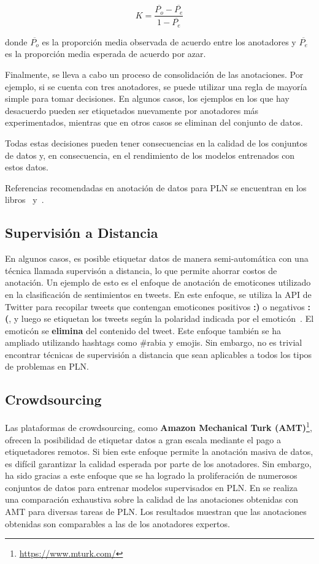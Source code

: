 \[
K = \frac{\overline{P_o} - \overline{P_e}}{1 - \overline{P_e}}
\]

donde \(\overline{P_o}\) es la proporción media observada de acuerdo entre los anotadores y \(\overline{P_e}\) es la proporción media esperada de acuerdo por azar.

Finalmente, se lleva a cabo un proceso de consolidación de las anotaciones. Por ejemplo, si se cuenta con tres anotadores, se puede utilizar una regla de mayoría simple para tomar decisiones. En algunos casos, los ejemplos en los que hay desacuerdo pueden ser etiquetados nuevamente por anotadores más experimentados, mientras que en otros casos se eliminan del conjunto de datos.

Todas estas decisiones pueden tener consecuencias en la calidad de los conjuntos de datos y, en consecuencia, en el rendimiento de los modelos entrenados con estos datos.

Referencias recomendadas en anotación de datos para PLN se encuentran en los libros~\cite{fort2016collaborative} y~\cite{pustejovsky2012natural}.


\subsection{Supervisión a Distancia}

En algunos casos, es posible etiquetar datos de manera semi-automática con una técnica llamada supervisón a distancia, lo que permite ahorrar costos de anotación. Un ejemplo de esto es el enfoque de anotación de emoticones utilizado en la clasificación de sentimientos en tweets. En este enfoque, se utiliza la API de Twitter para recopilar tweets que contengan emoticones positivos \textcolor[rgb]{0.00,0.00,1.00}{\textbf{:)}} o negativos \textcolor[rgb]{1.00,0.00,0.00}{\textbf{:(}}, y luego se etiquetan los tweets según la polaridad indicada por el emoticón~\cite{Read2005}. El emoticón se \textbf{elimina} del contenido del tweet. Este enfoque también se ha ampliado utilizando hashtags como \#rabia y emojis. Sin embargo, no es trivial encontrar técnicas de supervisión a distancia que sean aplicables a todos los tipos de problemas en PLN.

\subsection{Crowdsourcing}
Las plataformas de crowdsourcing, como \textbf{Amazon Mechanical Turk (AMT)}\footnote{\url{https://www.mturk.com/}}, ofrecen la posibilidad de etiquetar datos a gran escala mediante el pago a etiquetadores remotos. Si bien este enfoque permite la anotación masiva de datos, es difícil garantizar la calidad esperada por parte de los anotadores. Sin embargo, ha sido gracias a este enfoque que se ha logrado la proliferación de numerosos conjuntos de datos para entrenar modelos supervisados en PLN. En \cite{snow2008cheap} se realiza una comparación exhaustiva sobre la calidad de las anotaciones obtenidas con AMT para diversas tareas de PLN.  Los resultados muestran que las anotaciones obtenidas son comparables a las de los anotadores expertos. 

